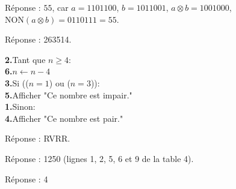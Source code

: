 \documentclass[class=report,crop=false, 12pt]{standalone}
\begin{document}
\begin{enigme}[Binaire]

Réponse : $55$, car $a = 1101100$, $b = 1011001$,
$a \otimes b = 1001000$, $\text{NON}(a\otimes b) = 0110111 = 55$.

\end{enigme}



\begin{enigme}[Boucles II]

Réponse : 263514.

\begin{center}
\begin{minipage}{0.8\textwidth}
\textbf{2.}\indentation Tant que $n\ge4$:\\
\textbf{6.}\indentation\indentation $n \leftarrow n - 4$\\
\textbf{3.}\indentation Si (($n=1$) ou  ($n=3$)):\\
\textbf{5.}\indentation\indentation Afficher "Ce nombre est impair."\\
\textbf{1.}\indentation Sinon:\\
\textbf{4.}\indentation\indentation Afficher "Ce nombre est pair."\\
\end{minipage}
\end{center} 


\end{enigme}


\begin{enigme}[Graphe]


Réponse : RVRR.



\end{enigme}




\begin{enigme}

Réponse : 1250 (lignes 1, 2, 5, 6 et 9 de la table 4).

\end{enigme}




\begin{enigme}[Pixels]

Réponse : 4


\end{enigme}
\end{document}
